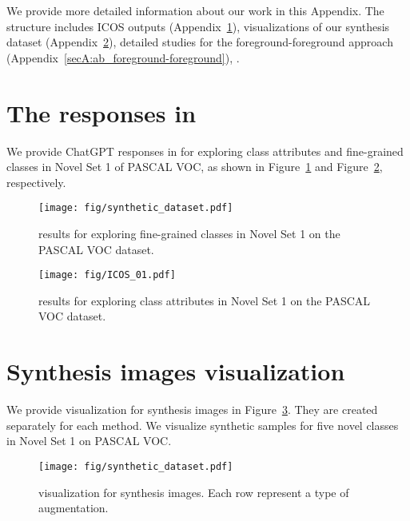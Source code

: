 
\newpage
We provide more detailed information about our work in this Appendix. The structure includes ICOS outputs (Appendix~\ref{secA:ICOS-output}), visualizations of our synthesis dataset  (Appendix~\ref{secA:synthesis-vis}),  detailed studies for the foreground-foreground approach (Appendix~\ref{secA:ab_foreground-foreground}), .

\section{The responses in }
\label{secA:ICOS-output}

We provide ChatGPT responses in  for exploring class attributes and fine-grained classes in Novel Set 1 of PASCAL VOC, as shown in Figure~\ref{fig:ICOS_output2} and Figure~\ref{fig:ICOS_output1}, respectively.


\begin{figure}[!hbt]
    \centering
    \texttt{[image: fig/synthetic\_dataset.pdf]}
    \caption{ results for exploring fine-grained classes in Novel Set 1 on the PASCAL VOC dataset.}
    \label{fig:ICOS_output2}
\end{figure}
\begin{figure}[!h]
    \centering
    \texttt{[image: fig/ICOS\_01.pdf]}
    \caption{ results for exploring class attributes in Novel Set 1 on the PASCAL VOC dataset.}
    \label{fig:ICOS_output1}
\end{figure}


\newpage
\section{Synthesis images visualization}
\label{secA:synthesis-vis}

We provide visualization for synthesis images in Figure~\ref{fig:synthetic-dataset}. They are created separately for each method. We visualize synthetic samples for five novel classes in Novel Set 1 on PASCAL VOC. 

\begin{figure}[h]
    \centering
    \texttt{[image: fig/synthetic\_dataset.pdf]}
    \caption{visualization for synthesis images. Each row represent a type of augmentation.}
    \label{fig:synthetic-dataset}
\end{figure}

